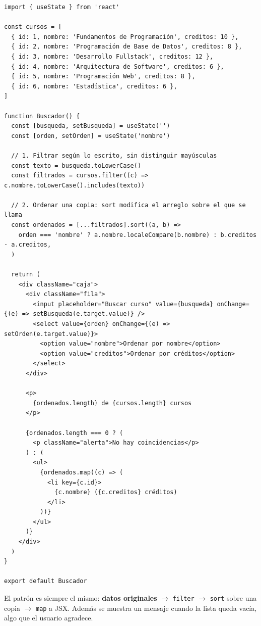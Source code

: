 \documentclass[11pt,a4paper]{article}
\newcommand{\cmd}[1]{\texttt{\color{reactdark}#1}}
\begin{document}
\begin{lstlisting}[language=JSX,title={\small\ttfamily src/components/listas/Buscador.jsx}]
import { useState } from 'react'

const cursos = [
  { id: 1, nombre: 'Fundamentos de Programación', creditos: 10 },
  { id: 2, nombre: 'Programación de Base de Datos', creditos: 8 },
  { id: 3, nombre: 'Desarrollo Fullstack', creditos: 12 },
  { id: 4, nombre: 'Arquitectura de Software', creditos: 6 },
  { id: 5, nombre: 'Programación Web', creditos: 8 },
  { id: 6, nombre: 'Estadística', creditos: 6 },
]

function Buscador() {
  const [busqueda, setBusqueda] = useState('')
  const [orden, setOrden] = useState('nombre')

  // 1. Filtrar según lo escrito, sin distinguir mayúsculas
  const texto = busqueda.toLowerCase()
  const filtrados = cursos.filter((c) => c.nombre.toLowerCase().includes(texto))

  // 2. Ordenar una copia: sort modifica el arreglo sobre el que se llama
  const ordenados = [...filtrados].sort((a, b) =>
    orden === 'nombre' ? a.nombre.localeCompare(b.nombre) : b.creditos - a.creditos,
  )

  return (
    <div className="caja">
      <div className="fila">
        <input placeholder="Buscar curso" value={busqueda} onChange={(e) => setBusqueda(e.target.value)} />
        <select value={orden} onChange={(e) => setOrden(e.target.value)}>
          <option value="nombre">Ordenar por nombre</option>
          <option value="creditos">Ordenar por créditos</option>
        </select>
      </div>

      <p>
        {ordenados.length} de {cursos.length} cursos
      </p>

      {ordenados.length === 0 ? (
        <p className="alerta">No hay coincidencias</p>
      ) : (
        <ul>
          {ordenados.map((c) => (
            <li key={c.id}>
              {c.nombre} ({c.creditos} créditos)
            </li>
          ))}
        </ul>
      )}
    </div>
  )
}

export default Buscador
\end{lstlisting}

El patrón es siempre el mismo: \textbf{datos originales} $\rightarrow$ \cmd{filter} $\rightarrow$ \cmd{sort} sobre una copia $\rightarrow$ \cmd{map} a JSX. Además se muestra un mensaje cuando la lista queda vacía, algo que el usuario agradece.

\end{document}
